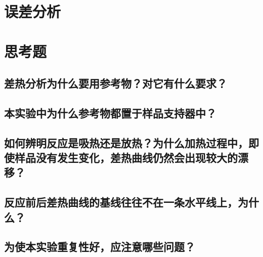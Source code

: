\documentclass[a4paper]{article}
\begin{document}
\section{误差分析}

\section{思考题}
\subsection*{差热分析为什么要用参考物？对它有什么要求？}
\subsection*{本实验中为什么参考物都置于样品支持器中？}
\subsection*{如何辨明反应是吸热还是放热？为什么加热过程中，即使样品没有发生变化，差热曲线仍然会出现较大的漂移？}
\subsection*{反应前后差热曲线的基线往往不在一条水平线上，为什么？}
\subsection*{为使本实验重复性好，应注意哪些问题？}

\nocite{jiaocai}

\end{document}

